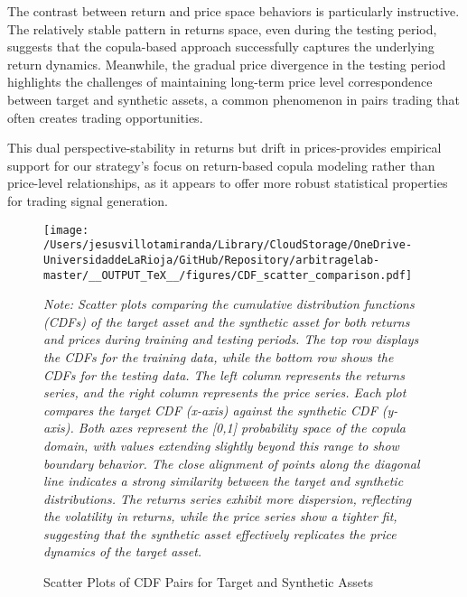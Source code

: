 The contrast between return and price space behaviors is particularly instructive. The relatively stable pattern in returns space, even during the testing period, suggests that the copula-based approach successfully captures the underlying return dynamics. Meanwhile, the gradual price divergence in the testing period highlights the challenges of maintaining long-term price level correspondence between target and synthetic assets, a common phenomenon in pairs trading that often creates trading opportunities.

This dual perspective-stability in returns but drift in prices-provides empirical support for our strategy's focus on return-based copula modeling rather than price-level relationships, as it appears to offer more robust statistical properties for trading signal generation.

\begin{figure}[H]
  \caption{Scatter Plots of CDF Pairs for Target and Synthetic Assets}
  \centering
  \texttt{[image: /Users/jesusvillotamiranda/Library/CloudStorage/OneDrive-UniversidaddeLaRioja/GitHub/Repository/arbitragelab-master/\_\_OUTPUT\_TeX\_\_/figures/CDF\_scatter\_comparison.pdf]}
  \label{fig:CDF_scatter_comparison}
\vspace{0.5cm}
\begin{minipage}{\textwidth}
\setlength{\parindent}{0pt}
\footnotesize\textit{Note: 
Scatter plots comparing the cumulative distribution functions (CDFs) of the target asset and the synthetic asset for both returns and prices during training and testing periods. The top row displays the CDFs for the training data, while the bottom row shows the CDFs for the testing data. The left column represents the returns series, and the right column represents the price series. Each plot compares the target CDF (x-axis) against the synthetic CDF (y-axis). Both axes represent the [0,1] probability space of the copula domain, with values extending slightly beyond this range to show boundary behavior. The close alignment of points along the diagonal line indicates a strong similarity between the target and synthetic distributions. The returns series exhibit more dispersion, reflecting the volatility in returns, while the price series show a tighter fit, suggesting that the synthetic asset effectively replicates the price dynamics of the target asset.
}
\end{minipage}

\end{figure}


